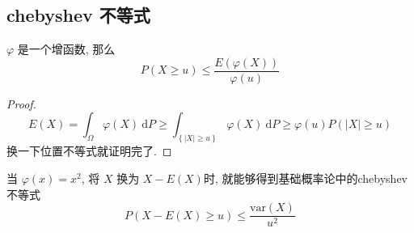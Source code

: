 \documentclass[a4paper, 10pt]{ctexart} %
\begin{document}
    \subsection{chebyshev 不等式}
    $\varphi$ 是一个增函数, 那么
    \[
    P\left( X \ge u\right) \le \frac{E \left( \varphi (X)\right)}{\varphi (u)}
    \]
    \begin{proof}
        \[
        E \left(X\right) = \int _{\Omega} \varphi \left(X\right) \ \mathrm{d}P \ge \int _{\left\{\left| X \right| \ge u\right\}} \varphi \left(X\right) \ \mathrm{d}P \ge \varphi (u) P(\left| X \right|  \ge u)
        \]
        换一下位置不等式就证明完了.
    \end{proof}
    当 $\varphi \left(x\right)  = x^{2}$, 将 $X$ 换为 $X - E\left(X\right)$时, 就能够得到基础概率论中的chebyshev不等式
    \[
    P \left(X - E\left(X\right) \ge u\right) \le \frac{\text{var} \left(X\right)}{u^{2}}
    \]
\end{document}
